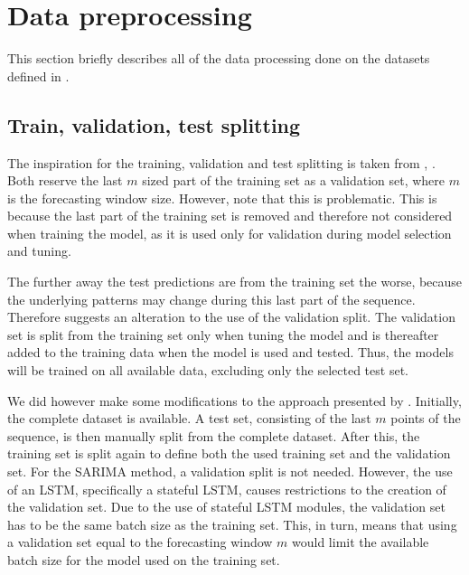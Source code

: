 \section{Data preprocessing}
\label{section:Method:Preprocessing}
This section briefly describes all of the data processing done on the datasets defined in .

\subsection{Train, validation, test splitting}

The inspiration for the training, validation and test splitting is taken from
\cite{Bandara2019}, \cite{Hewamalage2021}.
Both reserve the last $m$ sized part of the training set as a validation set,
where $m$ is the forecasting window size.
However, \cite{Hewamalage2021} note that this is problematic.
This is because the last part of the training set is removed
and therefore not considered when training the model, as it is used only for validation during model selection and tuning.

The further away the test predictions are from the training set the worse,
because the underlying patterns may change during this last part of the sequence.
Therefore \cite{Hewamalage2021} suggests an alteration to the use of the validation split.
The validation set is split from the training set only when tuning the model
and is thereafter added to the training data when the model is used and tested.
Thus, the models will be trained on all available data, excluding only the selected test set.

We did however make some modifications to the approach presented by \cite{Hewamalage2021}.
Initially, the complete dataset is available.
A test set, consisting of the last $m$ points of the sequence, is then manually split from the complete dataset.
After this, the training set is split again to define both the used training set and the validation set.
For the SARIMA method, a validation split is not needed.
However, the use of an LSTM, specifically a stateful LSTM, causes restrictions to the creation of the validation set.
Due to the use of stateful LSTM modules, the validation set has to be the same batch size as the training set.
This, in turn, means that using a validation set equal to the forecasting window $m$ would limit the available batch size for the model
used on the training set.

